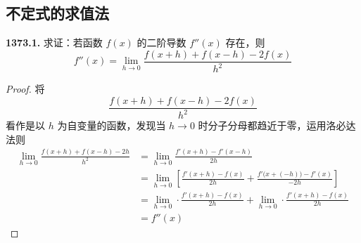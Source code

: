 \subsection{不定式的求值法}
\textbf{1373.1.} 求证：若函数 $f(x)$ 的二阶导数 $f''(x)$ 存在，则
\[f''(x) = \lim_{h \rightarrow 0} \frac{f(x + h) + f(x - h) - 2f(x)}{h^2}\]

\begin{proof}
    将
    \[\frac{f(x + h) + f(x - h) - 2f(x)}{h^2}\]
    看作是以 $h$ 为自变量的函数，发现当 $h \rightarrow 0$ 时分子分母都趋近于零，运用洛必达法则
    \begin{align*}
        \lim_{h \rightarrow 0} \frac{f(x + h) + f(x - h) - 2h}{h^2} &= \lim_{h \rightarrow 0} \frac{f'(x+h) - f'(x-h)}{2h}\\
        &= \lim_{h \rightarrow 0} \left[\frac{f'(x+h) - f(x)}{2h} + \frac{f'\bigl(x+(-h)\bigr) - f'(x)}{-2h}\right]\\
        &= \lim_{h \rightarrow 0} \cdot \frac{f'(x+h) - f(x)}{2h} + \lim_{h \rightarrow 0} \cdot \frac{f'(x+h) - f(x)}{2h}\\
        &= f''(x)
    \end{align*}
\end{proof}